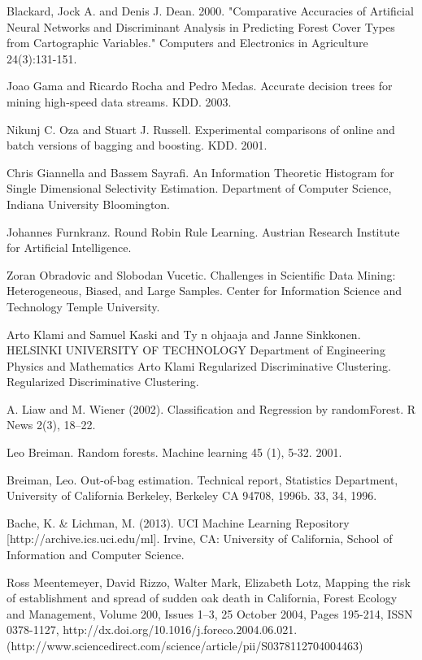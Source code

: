 \documentclass[12pt]{article}
\begin{document}
\pagebreak
\begin{thebibliography}{}
Blackard, Jock A. and Denis J. Dean. 2000. "Comparative Accuracies of Artificial Neural Networks and Discriminant Analysis in Predicting Forest Cover Types from Cartographic Variables." Computers and Electronics in Agriculture 24(3):131-151.

Joao Gama and Ricardo Rocha and Pedro Medas. Accurate decision trees for mining high-speed data streams. KDD. 2003.

Nikunj C. Oza and Stuart J. Russell. Experimental comparisons of online and batch versions of bagging and boosting. KDD. 2001.

Chris Giannella and Bassem Sayrafi. An Information Theoretic Histogram for Single Dimensional Selectivity Estimation. Department of Computer Science, Indiana University Bloomington.

Johannes Furnkranz. Round Robin Rule Learning. Austrian Research Institute for Artificial Intelligence.

Zoran Obradovic and Slobodan Vucetic. Challenges in Scientific Data Mining: Heterogeneous, Biased, and Large Samples. Center for Information Science and Technology Temple University.

Arto Klami and Samuel Kaski and Ty n ohjaaja and Janne Sinkkonen. HELSINKI UNIVERSITY OF TECHNOLOGY Department of Engineering Physics and Mathematics Arto Klami Regularized Discriminative Clustering. Regularized Discriminative Clustering.

A. Liaw and M. Wiener (2002). Classification and Regression by randomForest. R News 2(3), 18--22.

Leo Breiman. Random forests. Machine learning 45 (1), 5-32. 2001.

Breiman, Leo. Out-of-bag estimation. Technical report, Statistics Department, University of California Berkeley, Berkeley CA 94708, 1996b. 33, 34, 1996.

Bache, K. \& Lichman, M. (2013). UCI Machine Learning Repository [http://archive.ics.uci.edu/ml]. Irvine, CA: University of California, School of Information and Computer Science.

Ross Meentemeyer, David Rizzo, Walter Mark, Elizabeth Lotz, Mapping the risk of establishment and spread of sudden oak death in California, Forest Ecology and Management, Volume 200, Issues 1–3, 25 October 2004, Pages 195-214, ISSN 0378-1127, http://dx.doi.org/10.1016/j.foreco.2004.06.021.
(http://www.sciencedirect.com/science/article/pii/S0378112704004463)


\end{thebibliography}
\end{document}
